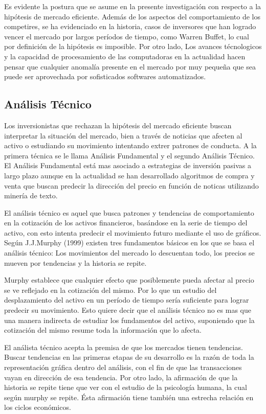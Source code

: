 \documentclass[a4paper,12pt]{Latex/Classes/PhDthesisPSnPDF}
\begin{document}
Es evidente la postura que se asume en la presente investigación con respecto a la hipótesis de mercado eficiente. Además de los aspectos del comportamiento de los competires, se ha evidenciado en la historia, casos de inversores que han logrado vencer el mercado por largos períodos de tiempo, como Warren Buffet, lo cual por definición de la hipótesis es imposible. Por otro lado, Los avances técnologicos y la capacidad de procesamiento de las computadoras en la actualidad hacen pensar que cualquier anomalía presente en el mercado por muy pequeña que sea puede ser aprovechada por sofisticados softwares automatizados.

\subsection{Análisis Técnico}

Los inversionistas que rechazan la hipótesis del mercado eficiente buscan interpretar la situación del mercado, bien a través de noticias que afecten al activo o estudiando su movimiento intentando extrer patrones de conducta. A la primera técnica se le llama Análisis Fundamental y el segundo Análisis Técnico. El Análisis Fundamental está mas asociado a estrategias de inversión pasivas a largo plazo aunque en la actualidad se han desarrollado algoritmos de compra y venta que buscan predecir la dirección del precio en función de noticas utilizando minería de texto.

El análisis técnico es aquel que busca patrones y tendencias de comportamiento en la cotización de los activos financieros, basándose en la serie de tiempo del activo, con esto intenta predecir el movimiento futuro mediante el uso de gráficos. Según J.J.Murphy (1999) existen tres fundamentos básicos en los que se basa el análisis técnico: Los movimientos del mercado lo descuentan  todo, los precios se mueven por tendencias y la historia se repite.

Murphy establece que cualquier efecto que posiblemente pueda afectar al precio se ve reflejado en la cotización del mismo. Por lo que un estudio del desplazamiento del activo en un período de tiempo sería suficiente para lograr predecir su movimiento. Esto quiere decir que el análisis técnico no es mas que una manera indirecta de estudiar los fundamentos del activo, suponiendo que la cotización del mismo resume toda la información que lo afecta. 

El análista técnico acepta la premisa de que los mercados tienen tendencias. Buscar tendencias en las primeras etapas de su desarrollo es la razón de toda la representación gráfica dentro del análisis, con el fin de que las transacciones vayan en dirección de esa tendencia. Por otro lado, la afirmación de que la historia se repite tiene que ver con el estudio de la psicología humana, la cual según murphy se repite. Ésta afirmación tiene también una estrecha relación en los ciclos económicos. 
\end{document}
